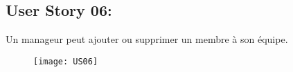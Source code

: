 \newpage
\subsection{User Story 06:}
Un manageur peut ajouter ou supprimer un membre à son équipe.


\begin{figure}[!h]
  \begin{center}
        \texttt{[image: US06]}
        \label{US06-dia}
  \end{center}
\end{figure}